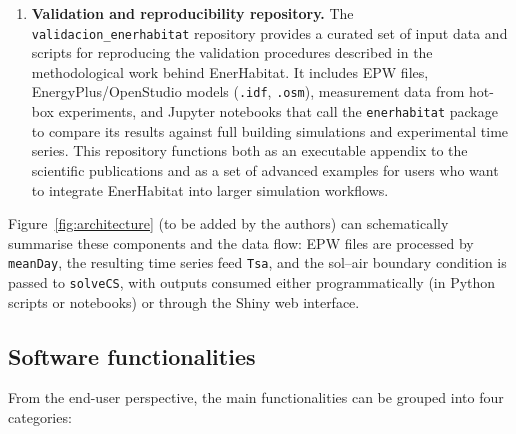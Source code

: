\documentclass[preprint,12pt, a4paper]{elsarticle}
\begin{document}
\begin{enumerate}
  \item \textbf{Validation and reproducibility repository.} The \texttt{validacion\_enerhabitat} repository provides a curated set of input data and scripts for reproducing the validation procedures described in the methodological work behind EnerHabitat. It includes EPW files, EnergyPlus/OpenStudio models (\texttt{.idf}, \texttt{.osm}), measurement data from hot-box experiments, and Jupyter notebooks that call the \texttt{enerhabitat} package to compare its results against full building simulations and experimental time series. This repository functions both as an executable appendix to the scientific publications and as a set of advanced examples for users who want to integrate EnerHabitat into larger simulation workflows.
\end{enumerate}

Figure~\ref{fig:architecture} (to be added by the authors) can schematically summarise these components and the data flow: EPW files are processed by \texttt{meanDay}, the resulting time series feed \texttt{Tsa}, and the sol--air boundary condition is passed to \texttt{solveCS}, with outputs consumed either programmatically (in Python scripts or notebooks) or through the Shiny web interface.

\subsection{Software functionalities}

From the end-user perspective, the main functionalities can be grouped into four categories:
\end{document}
